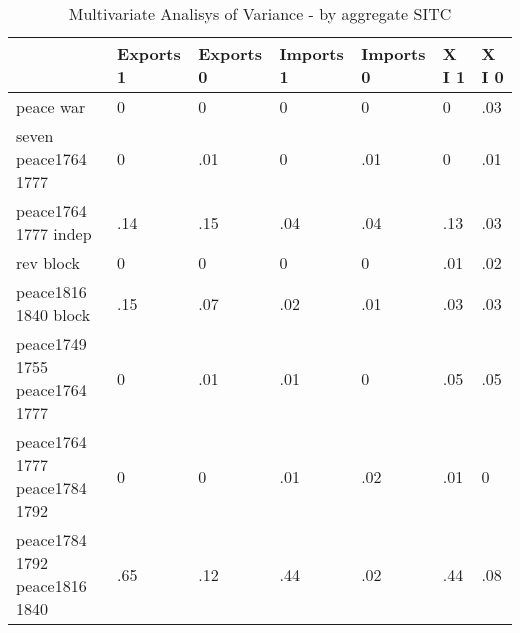 \begin{table}[htbp]
\caption{\label{tab:manova_test_aggr} Multivariate Analisys of Variance - by aggregate SITC}\centering\medskip
\begin{tabular}{|l|l|l|l|l|l|l|}\hline  
 & Exports 1  & Exports 0  & Imports 1  & Imports 0  & X I 1  & X I 0  \\ \hline  
peace war & 0 & 0 & 0 & 0 & 0 & .03 \\ \hline 
seven peace1764 1777 & 0 & .01 & 0 & .01 & 0 & .01 \\ \hline 
peace1764 1777 indep & .14 & .15 & .04 & .04 & .13 & .03 \\ \hline 
rev block & 0 & 0 & 0 & 0 & .01 & .02 \\ \hline 
peace1816 1840 block & .15 & .07 & .02 & .01 & .03 & .03 \\ \hline 
peace1749 1755 peace1764 1777 & 0 & .01 & .01 & 0 & .05 & .05 \\ \hline 
peace1764 1777 peace1784 1792 & 0 & 0 & .01 & .02 & .01 & 0 \\ \hline 
peace1784 1792 peace1816 1840 & .65 & .12 & .44 & .02 & .44 & .08 \\ \hline 
  \end{tabular}
\end{table}

